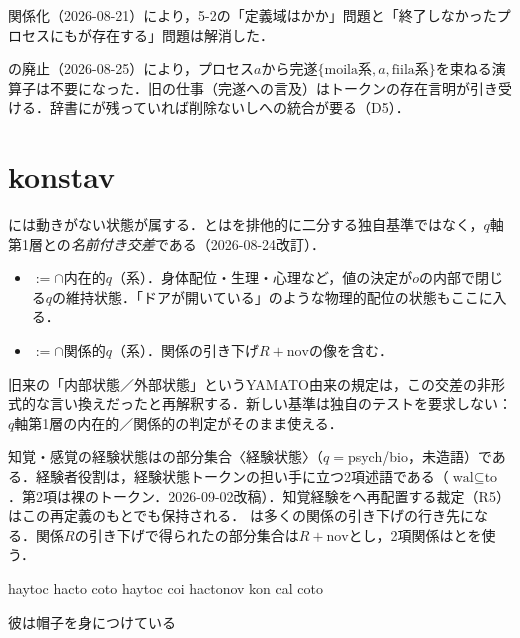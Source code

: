 \documentclass[../../main-detail.tex]{subfiles}
\begin{document}
\begin{araidashi}
    \item 関係化（2026-08-21）により，5-2の「定義域はかか」問題と「終了しなかったプロセスにもが存在する」問題は解消した．
    \item {}の廃止（2026-08-25）により，プロセス$a$から完遂$\{\text{moila}系, a, \text{fiila}系\}$を束ねる演算子は不要になった．旧の仕事（完遂への言及）はトークンの存在言明が引き受ける．辞書にが残っていれば削除ないしへの統合が要る（D5）．
\end{araidashi}

\section{konstav}\label{konstav}
には動きがない状態が属する．とはを排他的に二分する独自基準ではなく，$q$軸第1層との\emph{名前付き交差}である（2026-08-24改訂）．
\begin{itemize}
    \item {}$:=$$\cap$内在的$q$（系）．身体配位・生理・心理など，値の決定が$o$の内部で閉じる$q$の維持状態．「ドアが開いている」のような物理的配位の状態もここに入る．
    \item {}$:=$$\cap$関係的$q$（系）．関係の引き下げ$R+\text{nov}$の像を含む．
\end{itemize}
旧来の「内部状態／外部状態」というYAMATO由来の規定は，この交差の非形式的な言い換えだったと再解釈する．新しい基準は独自のテストを要求しない：$q$軸第1層の内在的／関係的の判定がそのまま使える．

知覚・感覚の経験状態はの部分集合〈経験状態〉（$q=$psych/bio，未造語）である．経験者役割は，経験状態トークンの担い手に立つ2項述語である（$\text{wal}\subseteq\text{to}$．第2項は裸のトークン．2026-09-02改稿）．知覚経験をへ再配置する裁定（R5）はこの再定義のもとでも保持される．
は多くの関係の引き下げの行き先になる．関係$R$の引き下げで得られたの部分集合は$R+\text{nov}$とし，2項関係はとを使う．
\begin{exe}
    \ex \begin{xlist}
        \ex haytoc hacto coto
        \ex haytoc coi hactonov kon cal coto
    \end{xlist}
    \glt 彼は帽子を身につけている
\end{exe}
\end{document}
